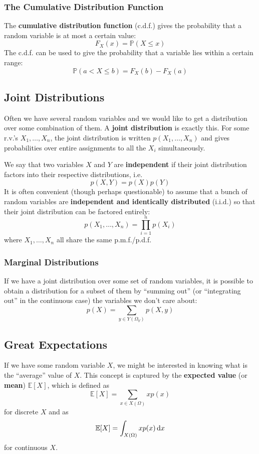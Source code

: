 \documentclass{article}
\newcommand{\pr}[1]{\mathbb{P}(#1)}
\newcommand{\ev}[1]{\mathbb{E}[#1]}
\newcommand{\term}[1]{\textbf{#1}}
\begin{document}
\subsubsection{The Cumulative Distribution Function}
The \term{cumulative distribution function} (c.d.f.) gives the probability that a random variable is at most a certain value:
\[F_X(x) = \pr{X \leq x}\]
The c.d.f. can be used to give the probability that a variable lies within a certain range:
\[\pr{a < X \leq b} = F_X(b) - F_X(a)\]

\subsection{Joint Distributions}
Often we have several random variables and we would like to get a distribution over some combination of them. A \term{joint distribution} is exactly this. For some r.v.'s $X_1, \dots, X_n$, the joint distribution is written $p(X_1, \dots, X_n)$ and gives probabilities over entire assignments to all the $X_i$ simultaneously.

We say that two variables $X$ and $Y$ are \term{independent} if their joint distribution factors into their respective distributions, i.e.
\[p(X, Y) = p(X)p(Y)\]
It is often convenient (though perhaps questionable) to assume that a bunch of random variables are \term{independent and identically distributed} (i.i.d.) so that their joint distribution can be factored entirely:
\[p(X_1, \dots, X_n) = \prod_{i=1}^n p(X_i)\]
where $X_1, \dots, X_n$ all share the same p.m.f./p.d.f.

\subsubsection{Marginal Distributions}
If we have a joint distribution over some set of random variables, it is possible to obtain a distribution for a subset of them by ``summing out'' (or ``integrating out'' in the continuous case) the variables we don't care about:
\[p(X) = \sum_{y \in Y(\Omega_Y)} p(X, y)\]

\subsection{Great Expectations}
If we have some random variable $X$, we might be interested in knowing what is the ``average'' value of $X$. This concept is captured by the \term{expected value} (or \term{mean}) $\ev{X}$, which is defined as
\[\ev{X} = \sum_{x \in X(\Omega)} x p(x)\]
for discrete $X$ and as
\[\ev{X} = \int_{X(\Omega)} xp(x)\dif{x}\]
for continuous $X$.
\end{document}

